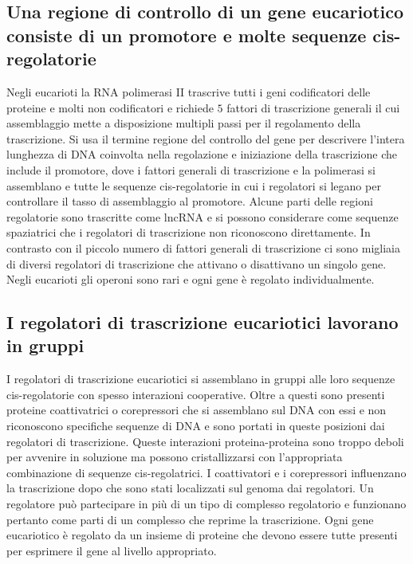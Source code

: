 \subsection{Una regione di controllo di un gene eucariotico consiste di un promotore e molte sequenze cis-regolatorie}
Negli eucarioti la RNA polimerasi II trascrive tutti i geni codificatori delle proteine e molti non codificatori e richiede $5$ fattori di trascrizione generali il cui assemblaggio mette
a disposizione multipli passi per il regolamento della trascrizione. Si usa il termine regione del controllo del gene per descrivere l'intera lunghezza di DNA coinvolta nella regolazione
e iniziazione della trascrizione che include il promotore, dove i fattori generali di trascrizione e la polimerasi si assemblano e tutte le sequenze cis-regolatorie in cui i regolatori
si legano per controllare il tasso di assemblaggio al promotore. Alcune parti delle regioni regolatorie sono trascritte come lncRNA e si possono considerare come sequenze spaziatrici
che i regolatori di trascrizione non riconoscono direttamente. In contrasto con il piccolo numero di fattori generali di trascrizione ci sono migliaia di diversi regolatori di 
trascrizione che attivano o disattivano un singolo gene. Negli eucarioti gli operoni sono rari e ogni gene \`e regolato individualmente. 
\subsection{I regolatori di trascrizione eucariotici lavorano in gruppi}
I regolatori di trascrizione eucariotici si assemblano in gruppi alle loro sequenze cis-regolatorie con spesso interazioni cooperative. Oltre a questi sono presenti proteine 
coattivatrici o corepressori che si assemblano sul DNA con essi e non riconoscono specifiche sequenze di DNA e sono portati in queste posizioni dai regolatori di trascrizione. Queste
interazioni proteina-proteina sono troppo deboli per avvenire in soluzione ma possono cristallizzarsi con l'appropriata combinazione di sequenze cis-regolatrici. I coattivatori e i 
corepressori influenzano la trascrizione dopo che sono stati localizzati sul genoma dai regolatori. Un regolatore pu\`o partecipare in pi\`u di un tipo di complesso regolatorio e 
funzionano pertanto come parti di un complesso che reprime la trascrizione. Ogni gene eucariotico \`e regolato da un insieme di proteine che devono essere tutte presenti per esprimere
il gene al livello appropriato.
